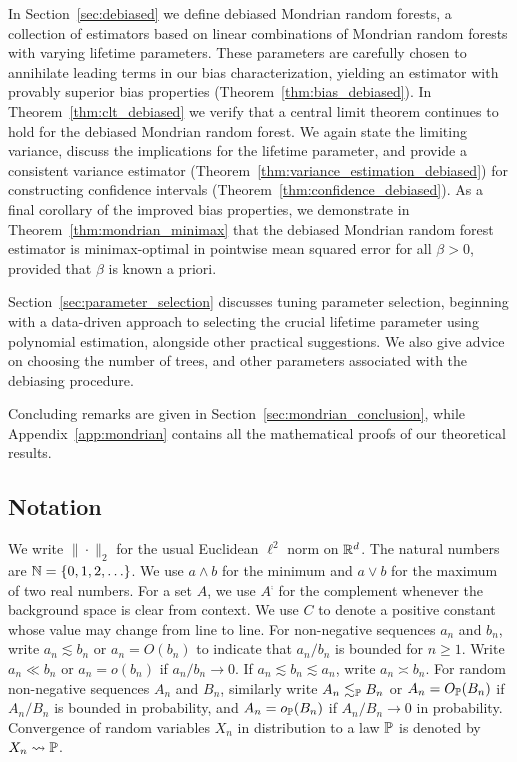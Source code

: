In Section~\ref{sec:debiased} we define debiased Mondrian random forests, a
collection of estimators based on linear combinations of Mondrian random
forests with varying lifetime parameters. These parameters are carefully chosen
to annihilate leading terms in our bias characterization, yielding an estimator
with provably superior bias properties (Theorem~\ref{thm:bias_debiased}). In
Theorem~\ref{thm:clt_debiased} we verify that a central limit theorem continues
to hold for the debiased Mondrian random forest. We again state the limiting
variance, discuss the implications for the lifetime parameter, and provide a
consistent variance estimator (Theorem~\ref{thm:variance_estimation_debiased})
for constructing confidence intervals (Theorem~\ref{thm:confidence_debiased}).
As a final corollary of the improved bias properties, we demonstrate in
Theorem~\ref{thm:mondrian_minimax} that the debiased Mondrian random forest
estimator is minimax-optimal in pointwise mean squared error for all
$\beta > 0$, provided that $\beta$ is known a priori.

Section~\ref{sec:parameter_selection} discusses tuning parameter selection,
beginning with a data-driven approach to selecting the crucial lifetime
parameter using polynomial estimation, alongside other practical suggestions.
We also give advice on choosing the number of trees, and other parameters
associated with the debiasing procedure.

Concluding remarks are given in Section~\ref{sec:mondrian_conclusion}, while
Appendix~\ref{app:mondrian} contains all the mathematical proofs of our
theoretical results.

\subsection{Notation}

We write $\|\cdot\|_2$ for the usual Euclidean $\ell^2$ norm on $\R^d$. The
natural numbers are $\N = \{0, 1, 2, \ldots \}$. We use $a \wedge b$ for the
minimum and $a \vee b$ for the maximum of two real numbers. For a set $A$, we
use $A^{\comp}$ for the complement whenever the background space is clear from
context. We use $C$ to denote a positive constant whose value may change from
line to line. For non-negative sequences $a_n$ and $b_n$, write
$a_n \lesssim b_n$ or $a_n = O(b_n)$ to indicate that $a_n / b_n$ is bounded
for $n\geq 1$. Write $a_n \ll b_n$ or $a_n = o(b_n)$ if $a_n / b_n \to 0$. If
$a_n \lesssim b_n \lesssim a_n$, write $a_n \asymp b_n$. For random
non-negative sequences $A_n$ and $B_n$, similarly write $A_n \lesssim_\P B_n$
or $A_n = O_\P(B_n)$ if $A_n / B_n$ is bounded in probability,
and $A_n = o_\P(B_n)$ if $A_n / B_n \to 0$ in probability. Convergence of
random variables $X_n$ in distribution to a law $\P$ is denoted by
$X_n \rightsquigarrow \P$.

